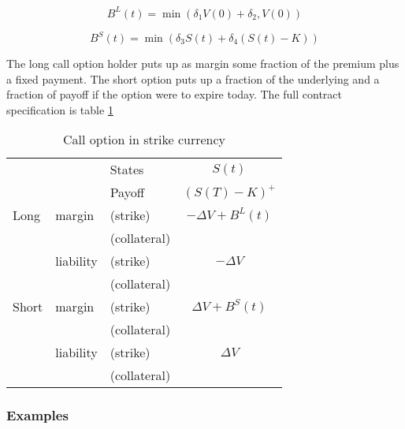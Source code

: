 \documentclass[12pt]{article}
\begin{document}
\[ B^L(t) = \min(\delta_1 V(0) + \delta_2, V(0)) \]

\[ B^S(t) = \min(\delta_3 S(t) + \delta_4 (S(t)-K)) \]

The long call option holder puts up as margin some fraction of the premium plus a fixed payment. The short option puts up a fraction of the underlying and a fraction of payoff if the option were to expire today.  The full contract specification is table \ref{tab:callstrike}

\begin{table}
\centering
\begin{tabular}{lll|c}
\hline
&  & States & $S(t)$\\
&  & Payoff &  $(S(T)-K)^+$\\
Long      & margin    & (strike)     & $-\Delta V + B^L(t)$  \\
          &           & (collateral) &\\
          & liability & (strike)     & $-\Delta V$\\
          &           & (collateral)&\\
Short     & margin    & (strike)     & $\Delta V + B^S(t)$ \\
          &           & (collateral) &\\
          & liability & (strike)     & $\Delta V$\\
          &           & (collateral) &\\          
\hline
\end{tabular}
\caption{Call option in strike currency}
\label{tab:callstrike}
\end{table}

\begin{comment}
\begin{itemize}
    \item State: Single state $S(T)$ 
    \item Payoff: $(S(T)-K)^+$
    \item Long margin (strike): $-\Delta V + B^L(t)$
    \item Short margin (strike): $\Delta V + B^S(t)$
    \item Long liability (strike): $\Delta V$
    \item Short liability (strike): $-\Delta V$
\end{itemize}
\end{comment}


\subsubsection*{Examples}
\end{document}
